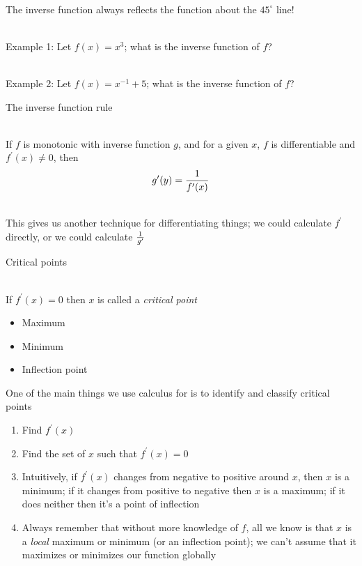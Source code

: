 \documentclass[10pt]{seminar}
\begin{document}
\begin{slide}
\ \\The inverse function always reflects the function about the $45^\circ$ line!

\newslide

\ \\Example 1:  Let $f(x)=x^3$; what is the inverse function of $f$?

\begin{center}

\end{center}
\newslide
\ \\Example 2: Let $f(x)=x^{-1}+5$; what is the inverse function of $f$?
\begin{center}

\end{center}


\newslide 
The inverse function rule

\ \\If $f$ is monotonic with inverse function $g$, and for a given $x$, $f$ is differentiable and $f^\prime(x)\not=0$, then $$g^\prime(y)={1\over {f^\prime(x)}}$$


\ \\This gives us another technique for differentiating things; we could calculate $f^\prime$ directly, or we could calculate $1\over{g^\prime}$

\newslide
Critical points

\ \\If $f^\prime(x)=0$ then $x$ is called a \textit{critical point}

\begin{itemize}
\item Maximum
\item Minimum
\item Inflection point
\end{itemize}

\begin{center}
  
\end{center}

\newslide

One of the main things we use calculus for is to identify and classify critical points

\begin{enumerate}
\item Find $f^\prime(x)$
\item Find the set of $x$ such that $f^\prime(x)=0$
\item Intuitively, if $f^\prime(x)$ changes from negative to positive around $x$, then $x$ is a minimum; if it changes from positive to negative then $x$ is a maximum; if it does neither then it's a point of inflection
\item Always remember that without more knowledge of $f$, all we know is that $x$ is a \textit{local} maximum or minimum (or an inflection point); we can't assume that it maximizes or minimizes our function globally
\end{enumerate}


\end{slide}
\end{document}
